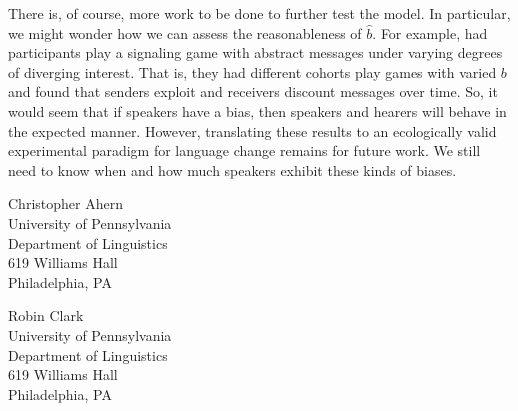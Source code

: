\documentclass[linguex]{sp}
\theoremstyle{definition} \newtheorem{definition}{Definition}
\begin{document}
There is, of course, more work to be done to further test the model. In particular, we might wonder how we can assess the reasonableness of $\hat{b}$. For example, \cite{blume-etal:2001} had participants play a signaling game with abstract messages under  varying degrees of diverging interest. That is, they had different cohorts play games with varied $b$ and found that senders exploit and receivers discount messages over time. So, it would seem that if speakers have a bias, then speakers and hearers will behave in the expected manner. However, translating these results to an ecologically valid experimental paradigm for language change remains for future work. We still need to know when and how much speakers exhibit these kinds of biases.









\begin{addresses}
  \begin{address}
    Christopher Ahern \\
    University of Pennsylvania\\
    Department of Linguistics\\
    619 Williams Hall \\
    Philadelphia, PA \\
  \end{address}
  \begin{address}
    Robin Clark \\
    University of Pennsylvania\\
    Department of Linguistics\\
    619 Williams Hall \\
    Philadelphia, PA\\
  \end{address}
\end{addresses}
\end{document}
